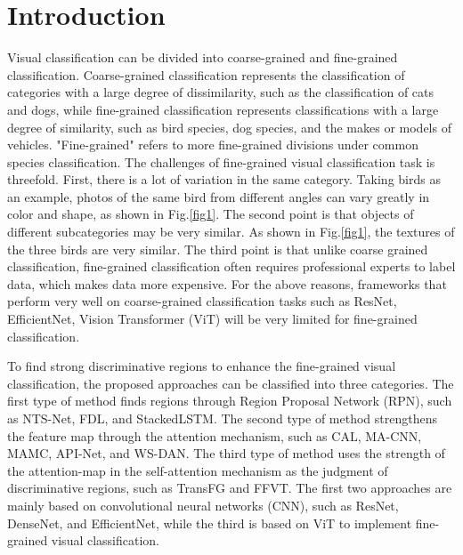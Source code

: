 \documentclass[conference]{IEEEtran}
\begin{document}
\section{Introduction}
Visual classification can be divided into coarse-grained and fine-grained classification. Coarse-grained classification represents the classification of categories with a large degree of dissimilarity, such as the classification of cats and dogs, while fine-grained classification represents classifications with a large degree of similarity, such as bird species\cite{CUB_200_2011}\cite{NABirds}, dog species\cite{Stanford_Dogs}, and the makes or models of vehicles\cite{Stanford_Cars}. "Fine-grained" refers to more fine-grained divisions under common species classification. The challenges of fine-grained visual classification task is threefold. First, there is a lot of variation in the same category. Taking birds as an example, photos of the same bird from different angles can vary greatly in color and shape, as shown in Fig.\ref{fig1}. The second point is that objects of different subcategories may be very similar. As shown in Fig.\ref{fig1}, the textures of the three birds are very similar. The third point is that unlike coarse grained classification, fine-grained classification often requires professional experts to label data, which makes data more expensive. For the above reasons, frameworks that perform very well on coarse-grained classification tasks such as ResNet\cite{ResNet}, EfficientNet\cite{EfficientNet}, Vision Transformer (ViT) \cite{ViT} will be very limited for fine-grained classification.

To find strong discriminative regions to enhance the fine-grained visual classification, the proposed approaches can be classified into three categories. The first type of method finds regions through Region Proposal Network (RPN)\cite{Faster_RCNN}, such as NTS-Net\cite{NTS_Net}, FDL\cite{FDL}, and StackedLSTM\cite{Stacked_LSTM}. The second type of method strengthens the feature map through the attention mechanism, such as CAL\cite{CAL}, MA-CNN\cite{MA_CNN}, MAMC\cite{MAMC}, API-Net\cite{API_Net}, and WS-DAN\cite{WS_DAN}. The third type of method uses the strength of the attention-map in the self-attention mechanism as the judgment of discriminative regions, such as TransFG\cite{TransFG} and FFVT\cite{FFVT}. The first two approaches are mainly based on convolutional neural networks (CNN), such as ResNet\cite{ResNet}, DenseNet\cite{DenseNet}, and EfficientNet\cite{EfficientNet}, while the third is based on ViT to implement fine-grained visual classification.
\end{document}
